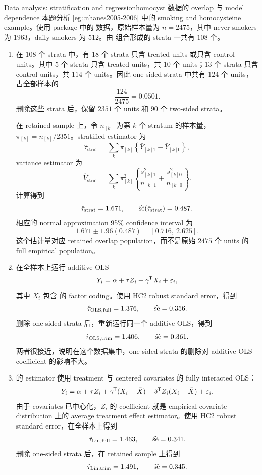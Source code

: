 \begin{exercisesolution}{Data analysis: stratification and regression}{homocyst 数据的 overlap 与 model dependence}
本题分析 \cref{eg::nhanes2005-2006} 中的 smoking and homocysteine example。使用  package 中的  数据，原始样本量为 $n=2475$，其中 never smokers 为 $1963$，daily smokers 为 $512$。由  组合形成的 strata 一共有 $108$ 个。

\begin{enumerate}[(1)]
\item
在 $108$ 个 strata 中，有 $18$ 个 strata 只含 treated units 或只含 control units。其中 $5$ 个 strata 只含 treated units，共 $10$ 个 units；$13$ 个 strata 只含 control units，共 $114$ 个 units。因此 one-sided strata 中共有 $124$ 个 units，占全部样本的
\[
\frac{124}{2475}=0.0501.
\]
删除这些 strata 后，保留 $2351$ 个 units 和 $90$ 个 two-sided strata。

在 retained sample 上，令 $n_{[k]}$ 为第 $k$ 个 stratum 的样本量，$\pi_{[k]}=n_{[k]}/2351$。stratified estimator 为
\[
\hat\tau_{\mathrm{strat}}
=\sum_k\pi_{[k]}
\left\{
\bar Y_{[k]1}-\bar Y_{[k]0}
\right\},
\]
variance estimator 为
\[
\hat V_{\mathrm{strat}}
=\sum_k\pi_{[k]}^2
\left\{
\frac{s_{[k]1}^2}{n_{[k]1}}
+\frac{s_{[k]0}^2}{n_{[k]0}}
\right\}.
\]
计算得到
\[
\hat\tau_{\mathrm{strat}}=1.671,\qquad
\widehat{\textup{se}}(\hat\tau_{\mathrm{strat}})=0.487.
\]
相应的 normal approximation 95\% confidence interval 为
\[
1.671\pm1.96(0.487)=[0.716,\ 2.625].
\]
这个估计量对应 retained overlap population，而不是原始 $2475$ 个 units 的 full empirical population。

\item
在全样本上运行 additive OLS
\[
Y_i=\alpha+\tau Z_i+\gamma^{\mkern-1.5mu\mathsf{T}} X_i+\varepsilon_i,
\]
其中 $X_i$ 包含  的 factor coding。使用 HC2 robust standard error，得到
\[
\hat\tau_{\mathrm{OLS,full}}=1.376,\qquad
\widehat{\textup{se}}=0.356.
\]
删除 one-sided strata 后，重新运行同一个 additive OLS，得到
\[
\hat\tau_{\mathrm{OLS,trim}}=1.406,\qquad
\widehat{\textup{se}}=0.361.
\]
两者很接近，说明在这个数据集中，one-sided strata 的删除对 additive OLS coefficient 的影响不大。

\item
\citet{lin2013} 的 estimator 使用 treatment 与 centered covariates 的 fully interacted OLS：
\[
Y_i=\alpha+\tau Z_i+\gamma^{\mkern-1.5mu\mathsf{T}} (X_i-\bar X)
+\delta^{\mkern-1.5mu\mathsf{T}} Z_i(X_i-\bar X)+\varepsilon_i.
\]
由于 covariates 已中心化，$Z_i$ 的 coefficient 就是 empirical covariate distribution 上的 average treatment effect estimator。使用 HC2 robust standard error，在全样本上得到
\[
\hat\tau_{\mathrm{Lin,full}}=1.463,\qquad
\widehat{\textup{se}}=0.341.
\]
删除 one-sided strata 后，在 retained sample 上得到
\[
\hat\tau_{\mathrm{Lin,trim}}=1.491,\qquad
\widehat{\textup{se}}=0.345.
\]


\end{enumerate}
\end{exercisesolution}
